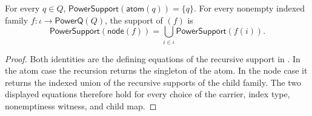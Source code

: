 \begin{lemma}
For every $q\in Q$,
$\mathsf{PowerSupport}(\mathsf{atom}(q))=\{q\}$.  For every nonempty
indexed family $f:\iota\to\mathsf{PowerQ}(Q)$, the support of
$(f)$ is
\[
\mathsf{PowerSupport}(\mathsf{node}(f))
 =\bigcup_{i\in\iota}\mathsf{PowerSupport}(f(i)).
\]
\end{lemma}
\begin{proof}
Both identities are the defining equations of the recursive support in
.  In the atom case the recursion returns the singleton
of the atom.  In the node case it returns the indexed union of the recursive
supports of the child family.  The two displayed equations therefore hold
for every choice of the carrier, index type, nonemptiness witness, and child
map.
\end{proof}
